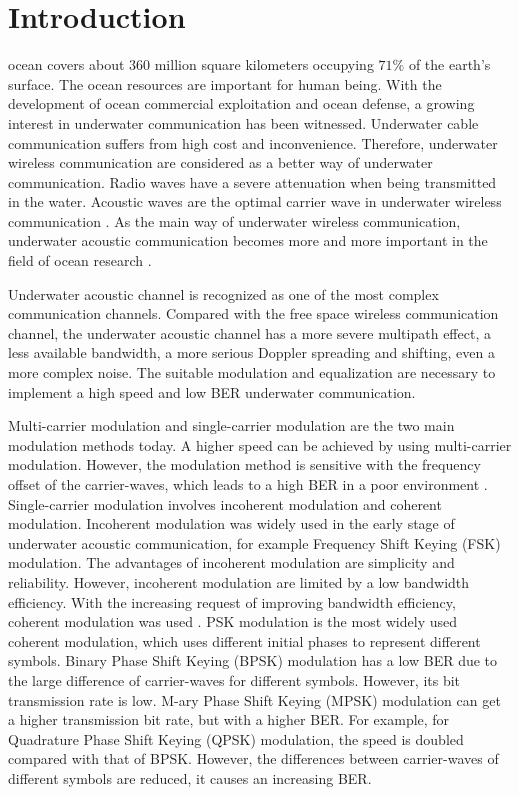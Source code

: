 \documentclass[journal]{IEEEtran}
\begin{document}
\section{Introduction}
 ocean covers about 360 million square
kilometers occupying $71\%$ of the earth's surface. The ocean
resources are important for human being. With the development of
ocean commercial exploitation and ocean defense, a growing interest
in underwater communication has been witnessed. Underwater cable
communication suffers from high cost and inconvenience. Therefore,
underwater wireless communication are considered as a better way of
underwater communication. Radio waves have a severe attenuation when
being transmitted in the water. Acoustic waves are the optimal
carrier wave in underwater wireless communication
\cite{Stojanovic2008}. As the main way of underwater wireless
communication, underwater acoustic communication becomes more and
more important in the field of ocean research
\cite{Shahabudeen2008}.

Underwater acoustic channel is recognized as one of the most complex
communication channels. Compared with the free space wireless
communication channel, the underwater acoustic channel has a more
severe multipath effect, a less available bandwidth, a more serious
Doppler spreading and shifting, even a more complex
noise\cite{Stojanovic2008,Du2011,Stojanovic2009}. The suitable
modulation and equalization are necessary to implement a high speed
and low BER underwater communication.

Multi-carrier modulation \cite{Li2008} and single-carrier modulation
are the two main modulation methods today. A higher speed can be
achieved by using multi-carrier modulation. However, the modulation
method is sensitive with the frequency offset of the carrier-waves,
which leads to a high BER in a poor environment \cite{He2010}.
Single-carrier modulation involves incoherent modulation and
coherent modulation. Incoherent modulation was widely used in the
early stage of underwater acoustic communication, for example
Frequency Shift Keying (FSK) modulation. The advantages of
incoherent modulation are simplicity and reliability. However,
incoherent modulation are limited by a low bandwidth efficiency.
With the increasing request of improving bandwidth efficiency,
coherent modulation was used \cite{Stojanovic2008}. PSK modulation
is the most widely used coherent modulation, which uses different
initial phases to represent different symbols. Binary Phase Shift
Keying (BPSK) modulation has a low BER due to the large difference
of carrier-waves for different symbols. However, its bit
transmission rate is low. M-ary Phase Shift Keying (MPSK) modulation
can get a higher transmission bit rate, but with a higher BER. For
example, for Quadrature Phase Shift Keying (QPSK) modulation, the
speed is doubled compared with that of BPSK. However, the
differences between carrier-waves of different symbols are reduced,
it causes an increasing BER.
\end{document}
